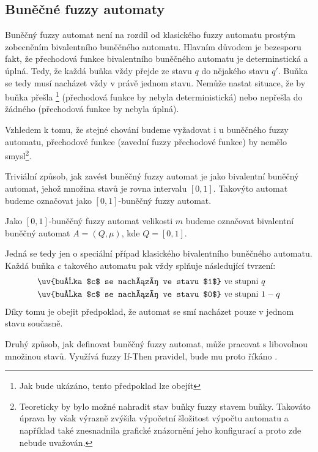 \documentclass[a4paper,10pt]{article}
\begin{document}
\subsection{Buněčné fuzzy automaty}
Buněčný fuzzy automat není na rozdíl od klasického fuzzy automatu prostým zobecněním bivalentního buněčného automatu. Hlavním důvodem je bezesporu fakt, že přechodová funkce bivalentního buněčného automatu je determinstická a úplná. Tedy, že každá buňka vždy přejde ze stavu $q$ do nějakého stavu $q'$. Buňka se tedy musí nacházet vždy v právě jednom stavu. Nemůže nastat situace, že by buňka přešla \footnote{Jak bude ukázáno, tento předpoklad lze obejít} (přechodová funkce by nebyla deterministická) nebo nepřešla do žádného (přechodová funkce by nebyla úplná).

Vzhledem k tomu, že stejné chování budeme vyžadovat i u buněčného fuzzy automatu,  přechodové funkce (zavední fuzzy přechodové funkce) by nemělo smysl\footnote{Teoreticky by bylo možné nahradit stav buňky fuzzy stavem buňky. Takováto úprava by však výrazně zvýšila výpočetní šložitost výpočtu automatu a například také znesnadnila grafické znázornění jeho konfigurací a proto zde nebude uvažován.}.

Triviální způsob, jak zavést buněčný fuzzy automat je jako bivalentní buněčný automat, jehož množina stavů je rovna intervalu $[0,1]$. Takovýto automat budeme označovat jako $[0,1]$-buněčný fuzzy automat.

\begin{definition}
 Jako $[0,1]$-buněčný fuzzy automat velikosti $m$ budeme označovat bivalentní buněčný automat $A = (Q, \mu)$, kde $Q = [0,1]$.
\end{definition}

Jedná se tedy jen o speciální případ klasického bivalentního buněčného automatu. Každá buňka $c$ takového automatu pak vždy splňuje následující tvrzení:
\begin{align*}
  & \text{\uv{buňka $c$ se nachází ve stavu $1$} ve stupni $q$}	\\
  & \text{\uv{buňka $c$ se nachází ve stavu $0$} ve stupni $1 - q$}
\end{align*}
Díky tomu je obejit předpoklad, že automat se smí nacházet pouze v jednom stavu současně.

Druhý způsob, jak definovat buněčný fuzzy automat, může pracovat s libovolnou množinou stavů. Využívá fuzzy If-Then pravidel, bude mu proto říkáno .
\end{document}
